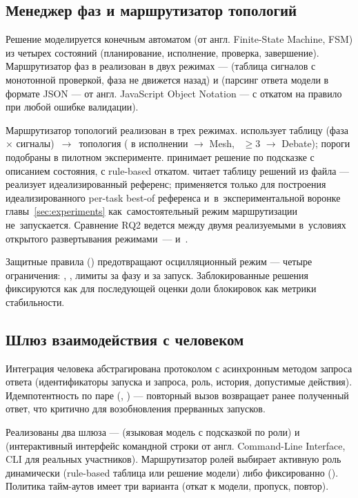 \subsection{Менеджер фаз и маршрутизатор топологий}
\label{sec:arch:phases}

Решение моделируется конечным автоматом (от англ. Finite-State
Machine, FSM) из четырех состояний (планирование, исполнение,
проверка, завершение). Маршрутизатор фаз в 
реализован в двух режимах ---  (таблица
сигналов с монотонной проверкой, фаза не движется назад) и
 (парсинг ответа модели в формате
JSON --- от англ. JavaScript Object Notation --- с откатом на
правило при любой ошибке валидации).

Маршрутизатор топологий реализован в трех режимах. 
использует таблицу (фаза $\times$ сигналы)~$\to$~топология
( в исполнении $\to$ Mesh, ~$\ge 3$
$\to$ Debate); пороги подобраны в пилотном эксперименте.
 принимает решение по подсказке с описанием
состояния, с rule-based откатом.  читает
таблицу решений из файла --- реализует идеализированный референс;
применяется только для построения идеализированного per-task best-of
референса и~в~экспериментальной воронке главы~\ref{sec:experiments}
как~самостоятельный режим маршрутизации не~запускается. Сравнение
RQ2 ведется между двумя реализуемыми в~условиях открытого развертывания
режимами~---  и~.

Защитные правила () предотвращают
осцилляционный режим --- четыре ограничения: ,
, лимиты за фазу и за запуск. Заблокированные
решения фиксируются как  для последующей
оценки доли блокировок как метрики стабильности.

\subsection{Шлюз взаимодействия с человеком}
\label{sec:arch:human}

Интеграция человека абстрагирована протоколом 
с асинхронным методом запроса ответа (идентификаторы запуска и
запроса, роль, история, допустимые действия). Идемпотентность по
паре (, ) --- повторный вызов
возвращает ранее полученный ответ, что критично для возобновления
прерванных запусков.

Реализованы два шлюза ---  (языковая
модель с подсказкой по роли) и  (интерактивный
интерфейс командной строки от англ. Command-Line Interface, CLI
для реальных участников). Маршрутизатор ролей выбирает
активную роль динамически (rule-based таблица или решение модели)
либо фиксированно (). Политика тайм-аутов
имеет три варианта (откат к модели, пропуск, повтор).

